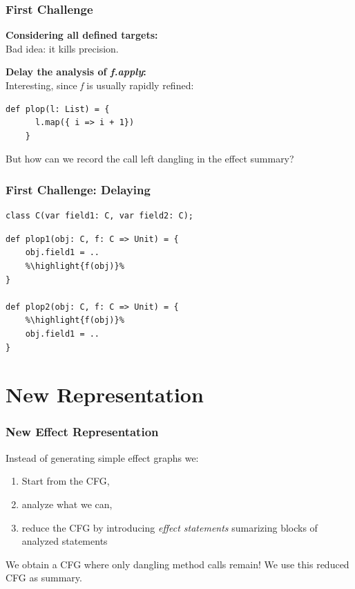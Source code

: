 \documentclass[hyperref={pdfpagelabels=false}]{beamer}
\newcommand\highlight[1]{\color{red}{#1}}
\begin{document}
\begin{frame}[fragile]
\frametitle{First Challenge}
    \textbf{Considering all defined targets:}\\
    \vspace{5pt}
    Bad idea: it kills precision.

    \vspace{25pt}
    \pause

    \textbf{Delay the analysis of \emph{f.apply}:}\\
    \vspace{5pt}
    Interesting, since \emph{f} is usually rapidly refined:

\begin{lstlisting}[escapechar=\%]
    def plop(l: List) = {
      l.map({ i => i + 1})
    }
\end{lstlisting}

 But how can we record the call left dangling in the effect summary?
\end{frame}

\begin{frame}[fragile]
\frametitle{First Challenge: Delaying}
\begin{lstlisting}[escapechar=\%]
class C(var field1: C, var field2: C);
\end{lstlisting}

\begin{lstlisting}[escapechar=\%]
def plop1(obj: C, f: C => Unit) = {
    obj.field1 = ..
    %\highlight{f(obj)}%
}

def plop2(obj: C, f: C => Unit) = {
    %\highlight{f(obj)}%
    obj.field1 = ..
}
\end{lstlisting}
    \begin{figure}
    \end{figure}
\end{frame}

\section{New Representation}
\begin{frame}[fragile]
\frametitle{New Effect Representation}
    Instead of generating simple effect graphs we:
    \begin{enumerate}
        \item Start from the CFG,
        \item analyze what we can,
        \item reduce the CFG by introducing \emph{effect statements} sumarizing
        blocks of analyzed statements
    \end{enumerate}

    \vspace{15pt}

    We obtain a CFG where only dangling method calls remain! We use this
    reduced CFG as summary.

\end{frame}
\end{document}
